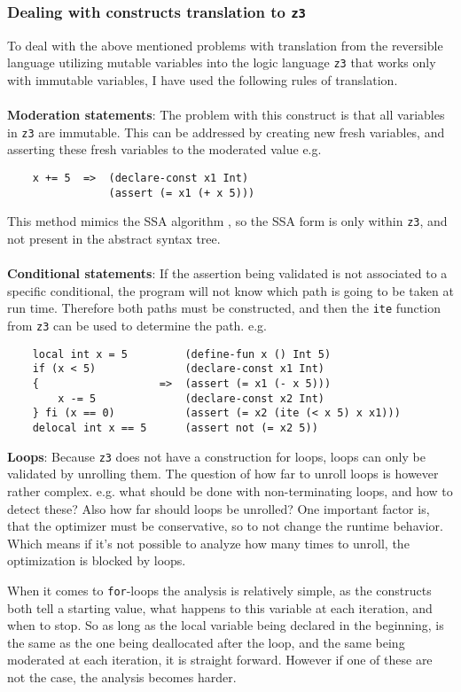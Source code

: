 \subsubsection{Dealing with \lan constructs translation to \texttt{z3}}
\label{translation-to-z3}
To deal with the above mentioned problems with translation from the reversible language \lan
utilizing mutable variables into the logic language \texttt{z3} that works only with immutable
variables, I have used the following rules of translation.
\\
\\
\textbf{Moderation statements}: The problem with this construct is that all variables in
\texttt{z3} are immutable. This can be addressed by creating new fresh variables, and asserting
these fresh variables to the moderated value e.g.
\begin{verbatim}
    x += 5  =>  (declare-const x1 Int)
                (assert (= x1 (+ x 5)))
\end{verbatim}
\noindent
This method mimics the SSA algorithm \cite{SSA}, so the SSA form is only within \texttt{z3}, and
not present in the abstract syntax tree.
\\
\\
\textbf{Conditional statements}:
If the assertion being validated is not associated to a specific conditional, the program will
not know which path is going to be taken at run time. Therefore both paths must be constructed,
and then the \texttt{ite} function from \texttt{z3} can be used to determine the path. e.g.
\begin{verbatim}
    local int x = 5         (define-fun x () Int 5)
    if (x < 5)              (declare-const x1 Int)
    {                   =>  (assert (= x1 (- x 5)))
        x -= 5              (declare-const x2 Int)
    } fi (x == 0)           (assert (= x2 (ite (< x 5) x x1)))
    delocal int x == 5      (assert not (= x2 5))
\end{verbatim}
\noindent
\textbf{Loops}:
Because \texttt{z3} does not have a construction for loops, loops can only be validated by unrolling
them. The question of how far to unroll loops is however rather complex. e.g. what should be done
with non-terminating loops, and how to detect these? Also how far should loops be unrolled? One
important factor is, that the optimizer must be conservative, so to not change the runtime behavior.
Which means if it's not possible to analyze how many times to unroll, the optimization is blocked
by loops.

When it comes to \texttt{for}-loops the analysis is relatively simple, as the constructs both
tell a starting value, what happens to this variable at each iteration, and when to stop.
So as long as the local variable being declared in the beginning, is the same as the one being
deallocated after the loop, and the same being moderated at each iteration, it is straight forward.
However if one of these are not the case, the analysis becomes harder.

